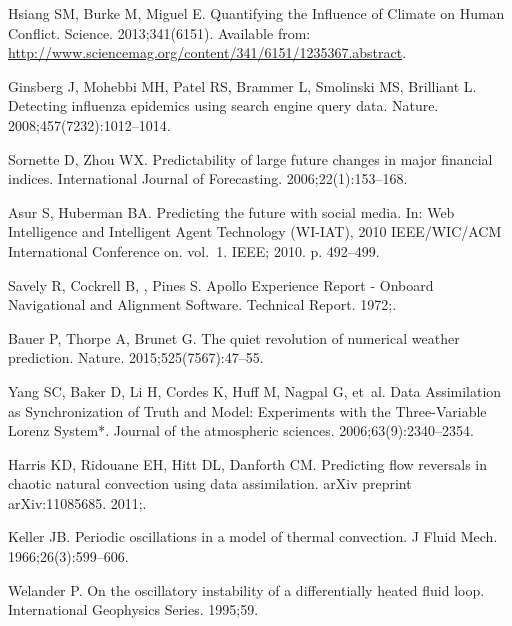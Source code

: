 \documentclass[10pt,letterpaper]{article}
\begin{document}
\nolinenumbers








\begin{thebibliography}{10}

Hsiang SM, Burke M, Miguel E.
\newblock Quantifying the Influence of Climate on Human Conflict.
\newblock Science. 2013;341(6151).
\newblock Available from:
  \url{http://www.sciencemag.org/content/341/6151/1235367.abstract}.

Ginsberg J, Mohebbi MH, Patel RS, Brammer L, Smolinski MS, Brilliant L.
\newblock Detecting influenza epidemics using search engine query data.
\newblock Nature. 2008;457(7232):1012--1014.

Sornette D, Zhou WX.
\newblock Predictability of large future changes in major financial indices.
\newblock International Journal of Forecasting. 2006;22(1):153--168.

Asur S, Huberman BA.
\newblock Predicting the future with social media.
\newblock In: Web Intelligence and Intelligent Agent Technology (WI-IAT), 2010
  IEEE/WIC/ACM International Conference on. vol.~1. IEEE; 2010. p. 492--499.

Savely R, Cockrell B, , Pines S.
\newblock Apollo Experience Report - Onboard Navigational and Alignment
  Software.
\newblock Technical Report. 1972;.

Bauer P, Thorpe A, Brunet G.
\newblock The quiet revolution of numerical weather prediction.
\newblock Nature. 2015;525(7567):47--55.

Yang SC, Baker D, Li H, Cordes K, Huff M, Nagpal G, et~al.
\newblock Data Assimilation as Synchronization of Truth and Model: Experiments
  with the Three-Variable Lorenz System*.
\newblock Journal of the atmospheric sciences. 2006;63(9):2340--2354.

Harris KD, Ridouane EH, Hitt DL, Danforth CM.
\newblock Predicting flow reversals in chaotic natural convection using data
  assimilation.
\newblock arXiv preprint arXiv:11085685. 2011;.

Keller JB.
\newblock Periodic oscillations in a model of thermal convection.
\newblock J Fluid Mech. 1966;26(3):599--606.

Welander P.
\newblock On the oscillatory instability of a differentially heated fluid loop.
\newblock International Geophysics Series. 1995;59.


\end{thebibliography}
\end{document}
